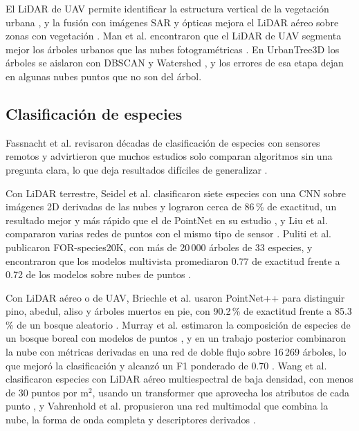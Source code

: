 \documentclass[preprint,12pt]{elsarticle}
\begin{document}
El LiDAR de UAV permite identificar la estructura vertical de la vegetación urbana \cite{yang2026vertical}, y la fusión con imágenes SAR y ópticas mejora el LiDAR aéreo sobre zonas con vegetación \cite{marks2025attention}. Man et al. encontraron que el LiDAR de UAV segmenta mejor los árboles urbanos que las nubes fotogramétricas \cite{man2025urban}. En UrbanTree3D los árboles se aislaron con DBSCAN y Watershed \cite{hamdani2026hybrid}, y los errores de esa etapa dejan en algunas nubes puntos que no son del árbol.

\subsection{Clasificación de especies}

Fassnacht et al. revisaron décadas de clasificación de especies con sensores remotos y advirtieron que muchos estudios solo comparan algoritmos sin una pregunta clara, lo que deja resultados difíciles de generalizar \cite{fassnacht2016review}.

Con LiDAR terrestre, Seidel et al. clasificaron siete especies con una CNN sobre imágenes 2D derivadas de las nubes y lograron cerca de 86\,\% de exactitud, un resultado mejor y más rápido que el de PointNet en su estudio \cite{seidel2021species}, y Liu et al. compararon varias redes de puntos con el mismo tipo de sensor \cite{liu2022ground}. Puliti et al. publicaron FOR-species20K, con más de 20\,000 árboles de 33 especies, y encontraron que los modelos multivista promediaron 0.77 de exactitud frente a 0.72 de los modelos sobre nubes de puntos \cite{puliti2025forspecies}.

Con LiDAR aéreo o de UAV, Briechle et al. usaron PointNet++ para distinguir pino, abedul, aliso y árboles muertos en pie, con 90.2\,\% de exactitud frente a 85.3\,\% de un bosque aleatorio \cite{briechle2020pointnetpp}. Murray et al. estimaron la composición de especies de un bosque boreal con modelos de puntos \cite{murray2024composition}, y en un trabajo posterior combinaron la nube con métricas derivadas en una red de doble flujo sobre 16\,269 árboles, lo que mejoró la clasificación y alcanzó un F1 ponderado de 0.70 \cite{murray2025dualstream}. Wang et al. clasificaron especies con LiDAR aéreo multiespectral de baja densidad, con menos de 30 puntos por m$^2$, usando un transformer que aprovecha los atributos de cada punto \cite{wang2024rse}, y Vahrenhold et al. propusieron una red multimodal que combina la nube, la forma de onda completa y descriptores derivados \cite{vahrenhold2025mmtscnet}.
\end{document}
